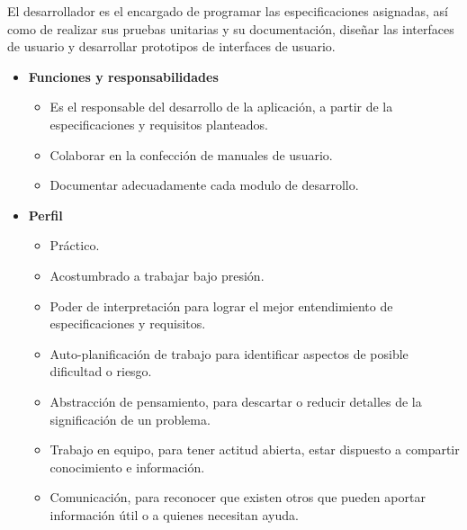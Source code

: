         El desarrollador es el encargado de programar las especificaciones asignadas, así como de realizar sus pruebas unitarias y su documentación, diseñar las interfaces de usuario y desarrollar prototipos de interfaces de usuario.
		\begin{itemize}
			\item \textbf{Funciones y responsabilidades}
            	\begin{itemize}
                    \item Es el responsable del desarrollo de la aplicación, a partir de la especificaciones y requisitos planteados.
                    \item Colaborar en la confección de manuales de usuario.
                    \item Documentar adecuadamente cada modulo de desarrollo.
				\end{itemize}
            
            \item \textbf{Perfil}
                \begin{itemize}
                    \item Práctico.
                    \item Acostumbrado a trabajar bajo presión.
                    \item Poder de interpretación para lograr el mejor entendimiento de especificaciones y requisitos.
                    \item Auto-planificación de trabajo para identificar aspectos de posible dificultad o riesgo.
                    \item Abstracción de pensamiento, para descartar o reducir detalles de la significación de un problema.
                    \item Trabajo en equipo, para tener actitud abierta, estar dispuesto a compartir conocimiento e información.
                    \item Comunicación, para reconocer que existen otros que pueden aportar información útil o a quienes necesitan ayuda.

                \end{itemize}


\end{itemize}
